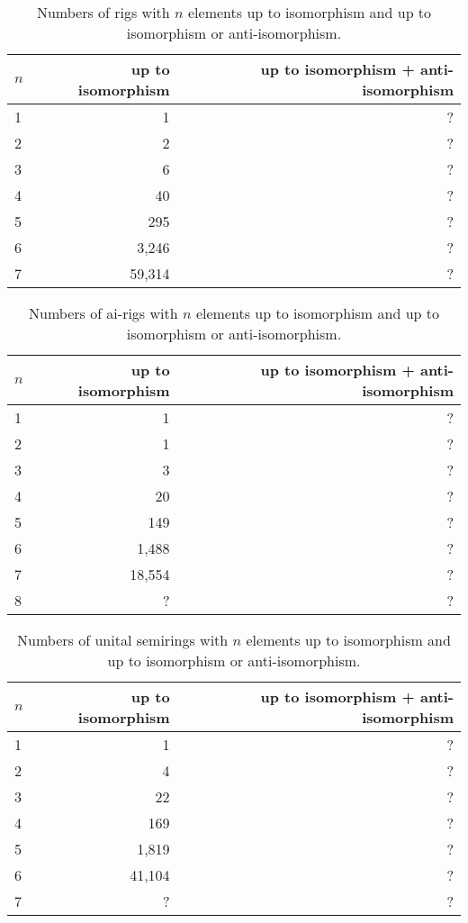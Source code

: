\documentclass{article}
\theoremstyle{definition}
\begin{document}
\begin{table}[ht]
    \centering
    \begin{tabular}{l|r|r}
      \toprule
      $n$ & up to isomorphism & up to isomorphism + anti-isomorphism \\
      \midrule
      1 & 1         & ? \\
      2 & 2         & ? \\
      3 & 6         & ? \\
      4 & 40        & ? \\
      5 & 295       & ? \\
      6 & 3,246     & ? \\
      7 & 59,314    & ? \\
    \end{tabular}
    \caption{Numbers of rigs with $n$ elements up to isomorphism and up
    to isomorphism or anti-isomorphism.}
    \label{tab:rigs}
\end{table}

\begin{table}[ht]
    \centering
    \begin{tabular}{l|r|r}
      \toprule
      $n$ & up to isomorphism & up to isomorphism + anti-isomorphism \\
      \midrule
      1 & 1         & ? \\
      2 & 1         & ? \\
      3 & 3         & ? \\
      4 & 20        & ? \\
      5 & 149       & ? \\
      6 & 1,488     & ? \\
      7 & 18,554    & ? \\
      8 & ?         & ? \\
    \end{tabular}
    \caption{Numbers of ai-rigs with $n$ elements up to isomorphism and up
    to isomorphism or anti-isomorphism.}
    \label{tab:ai-rigs}
\end{table}

\begin{table}[ht]
    \centering
    \begin{tabular}{l|r|r}
      \toprule
      $n$ & up to isomorphism & up to isomorphism + anti-isomorphism \\
      \midrule
      1 & 1         & ? \\
      2 & 4         & ? \\
      3 & 22        & ? \\
      4 & 169       & ? \\
      5 & 1,819     & ? \\
      6 & 41,104    & ? \\
      7 & ?         & ? \\
    \end{tabular}
    \caption{Numbers of unital semirings with $n$ elements up to isomorphism and up
    to isomorphism or anti-isomorphism.}
    \label{tab:unital-semirings}
\end{table}
\end{document}
